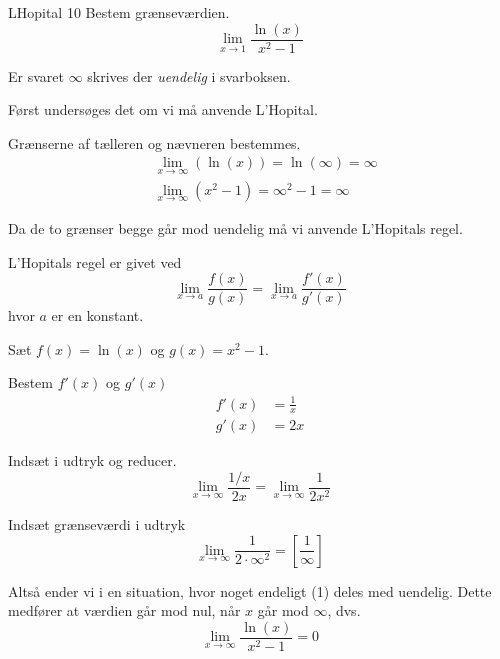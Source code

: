 \documentclass{article}
\begin{document}
\begin{exercise}{LHopital 10}
Bestem grænseværdien.
\[
\lim_{x \to 1} \frac{\ln(x)}{x^2-1}
\] 

Er svaret $\infty$ skrives der \emph{uendelig} i svarboksen.


\hint
Først undersøges det om vi må anvende L'Hopital.

\hint
Grænserne af tælleren og nævneren bestemmes.
\begin{align*}
	&\lim_{x \to \infty} (\ln(x)) = \ln(\infty) = \infty \\
	&\lim_{x \to \infty} (x^2 - 1) = \infty^2 - 1 = \infty
\end{align*}

\hint
Da de to grænser begge går mod uendelig må vi  anvende L'Hopitals regel. 

\hint
L'Hopitals regel er givet ved
\[
\lim_{x \to a} \frac{f(x)}{g(x)} = \lim_{x \to a} \frac{f'(x)}{g'(x)} 
\]
hvor $a$  er en konstant.

\hint
Sæt $f(x) = \ln(x)$ og $g(x) = x^2-1$. 

\hint
Bestem $f'(x)$ og $g'(x)$
\begin{align*}
	f'(x) &= \frac{1}{x} \\
	g'(x) &= 2x
\end{align*}

\hint
Indsæt i udtryk og reducer. 
\[
\lim_{x \to \infty} \frac{1/x}{2x} = \lim_{x \to \infty} \frac{1}{2x^2} 
\]

\hint
Indsæt grænseværdi i udtryk
\[
\lim_{x \to \infty} \frac{1}{2 \cdot \infty^2}  = \left[ \frac{1}{\infty}  \right] 
\]

\hint
Altså ender vi i en situation, hvor noget endeligt (1) deles med uendelig. Dette medfører at værdien går mod nul, når $x$ går mod $\infty$, dvs.
\[
\lim_{x \to \infty} \frac{\ln(x)}{x^2 - 1} = 0
\]


\end{exercise}
\end{document}
